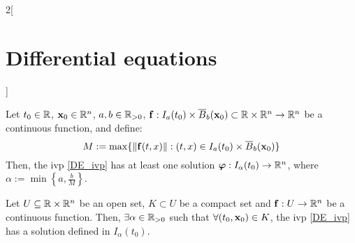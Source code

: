 \documentclass[../../../main.tex]{subfiles}
\begin{document}
\begin{multicols}{2}[\section{Differential equations}]
\begin{corollary}
  \end{corollary}
  \begin{theorem}
    Let $t_0\in\mathbb{R}$, $\boldsymbol{\mathrm{x}}_0\in\mathbb{R}^n$, $a,b\in\mathbb{R}_{>0}$, $\boldsymbol{\mathrm{f}}:I_a(t_0)\times\overline{B}_{b}(\boldsymbol{\mathrm{x}}_0)\subset\mathbb{R}\times\mathbb{R}^n\rightarrow\mathbb{R}^n$ be a continuous function, and define: $$M:=\max\{\|\boldsymbol{\mathrm{f}}(t,x)\|:(t,x)\in I_a(t_0)\times\overline{B}_{b}(\boldsymbol{\mathrm{x}}_0)\}$$ Then, the ivp \eqref{DE_ivp} has at least one solution $\boldsymbol{\mathrm{\varphi}}:I_\alpha(t_0)\rightarrow\mathbb{R}^n$, where $\alpha:=\min\left\{a,\frac{b}{M}\right\}$.
  \end{theorem}
  \begin{corollary}
    Let $U\subseteq\mathbb{R}\times\mathbb{R}^n$ be an open set, $K\subset U$ be a compact set and $\boldsymbol{\mathrm{f}}:U\rightarrow\mathbb{R}^n$ be a continuous function. Then, $\exists\alpha\in\mathbb{R}_{>0}$ such that $\forall (t_0,\boldsymbol{\mathrm{x}}_0)\in K$, the ivp \eqref{DE_ivp} has a solution defined in $I_\alpha(t_0)$.
  \end{corollary}

\end{multicols}
\end{document}
